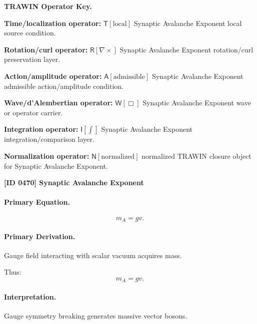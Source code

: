 \par\vspace{0.45\baselineskip}
\noindent\begin{minipage}[t]{\linewidth}
\begingroup
\small
\raggedright
\textbf{TRAWIN Operator Key.}\par
\noindent\textbf{Time/localization operator:} $\mathsf{T}\!\left[\mathrm{local}\right]$ Synaptic Avalanche Exponent local source condition.\par
\noindent\textbf{Rotation/curl operator:} $\mathsf{R}\!\left[\nabla\times\right]$ Synaptic Avalanche Exponent rotation/curl preservation layer.\par
\noindent\textbf{Action/amplitude operator:} $\mathsf{A}\!\left[\mathrm{admissible}\right]$ Synaptic Avalanche Exponent admissible action/amplitude condition.\par
\noindent\textbf{Wave/d'Alembertian operator:} $\mathsf{W}\!\left[\Box\right]$ Synaptic Avalanche Exponent wave or operator carrier.\par
\noindent\textbf{Integration operator:} $\mathsf{I}\!\left[\int\right]$ Synaptic Avalanche Exponent integration/comparison layer.\par
\noindent\textbf{Normalization operator:} $\mathsf{N}\!\left[\mathrm{normalized}\right]$ normalized TRAWIN closure object for Synaptic Avalanche Exponent.\par
\endgroup
\end{minipage}

\clearpage
\noindent\textbf{[ID 0470] Synaptic Avalanche Exponent}\par
\vspace{0.35em}
\paragraph{Primary Equation.}
\begin{equation}
m_A = gv.
\end{equation}

\paragraph{Primary Derivation.}
Gauge field interacting with scalar vacuum acquires mass.

Thus:
\begin{equation}
\boxed{
m_A = gv.
}
\end{equation}

\paragraph{Interpretation.}
Gauge symmetry breaking generates massive vector bosons.

